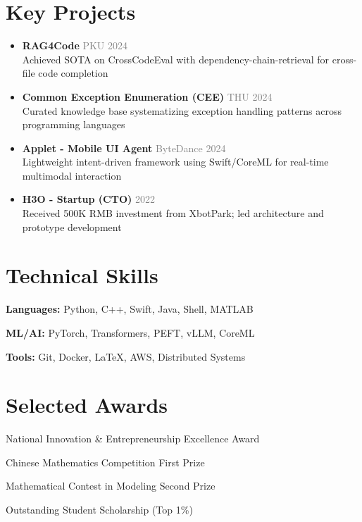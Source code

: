 \documentclass[11pt,letterpaper]{article}
\newcommand{\resumeProject}[3]{
  \vspace{-2pt}\item
    \textbf{\color{dark}#1} \hfill \textcolor{gray}{\small#2} \\
    \small#3 \vspace{-7pt}
}
\begin{document}
\section{Key Projects}
\begin{itemize}[leftmargin=0.15in, label={}]
  \resumeProject{RAG4Code}{PKU 2024}{Achieved SOTA on CrossCodeEval with dependency-chain-retrieval for cross-file code completion}
  
  \resumeProject{Common Exception Enumeration (CEE)}{THU 2024}{Curated knowledge base systematizing exception handling patterns across programming languages}
  
  \resumeProject{Applet - Mobile UI Agent}{ByteDance 2024}{Lightweight intent-driven framework using Swift/CoreML for real-time multimodal interaction}
  
  \resumeProject{H3O - Startup (CTO)}{2022}{Received 500K RMB investment from XbotPark; led architecture and prototype development}
\end{itemize}

\begin{multicols}{2}
\section{Technical Skills}
\begin{itemize}[leftmargin=0.15in, label={}]
  \small{
    \item \textbf{Languages:} Python, C++, Swift, Java, Shell, MATLAB
    \item \textbf{ML/AI:} PyTorch, Transformers, PEFT, vLLM, CoreML
    \item \textbf{Tools:} Git, Docker, LaTeX, AWS, Distributed Systems
  }
\end{itemize}

\columnbreak

\section{Selected Awards}
\begin{itemize}[leftmargin=0.15in, label={}]
  \small{
    \item National Innovation \& Entrepreneurship Excellence Award
    \item Chinese Mathematics Competition First Prize
    \item Mathematical Contest in Modeling Second Prize
    \item Outstanding Student Scholarship (Top 1\%)
  }
\end{itemize}
\end{multicols}
\end{document}
